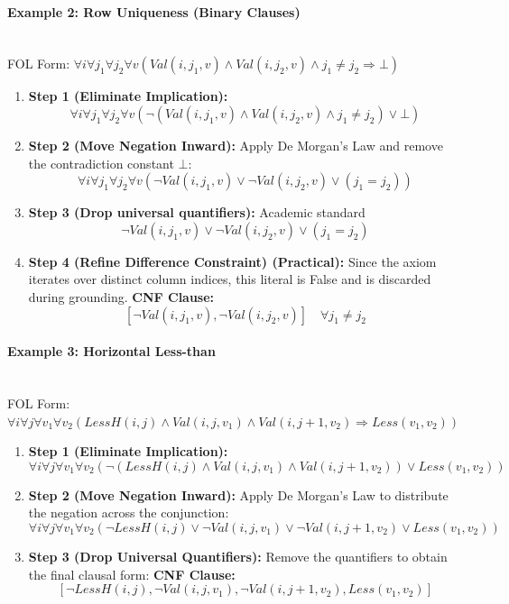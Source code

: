 \paragraph{Example 2: Row Uniqueness (Binary Clauses)}~\\
FOL Form: $\forall i \forall j_1 \forall j_2 \forall v (Val(i, j_1, v) \wedge Val(i, j_2, v) \wedge j_1 \neq j_2 \Rightarrow \bot)$
\begin{enumerate}
    \item \textbf{Step 1 (Eliminate Implication):}
    $$\forall i \forall j_1 \forall j_2 \forall v (\neg (Val(i, j_1, v) \wedge Val(i, j_2, v) \wedge j_1 \neq j_2) \vee \bot)$$
    \item \textbf{Step 2 (Move Negation Inward):} Apply De Morgan's Law and remove the contradiction constant $\bot$:
    $$\forall i \forall j_1 \forall j_2 \forall v (\neg Val(i, j_1, v) \vee \neg Val(i, j_2, v) \vee (j_1 = j_2))$$
    \item \textbf{Step 3 (Drop universal quantifiers):} Academic standard
    $$\neg Val(i, j_1, v) \vee \neg Val(i, j_2, v) \vee (j_1 = j_2)$$
    \item \textbf{Step 4 (Refine Difference Constraint) (Practical):} Since the axiom iterates over distinct column indices, this literal is False and is discarded during grounding.
    \textbf{CNF Clause:} $$[\neg Val(i, j_1, v), \neg Val(i, j_2, v)] \quad \forall j_1 \neq j_2$$
\end{enumerate}

\paragraph{Example 3: Horizontal Less-than}~\\
FOL Form: $\forall i \forall j \forall v_1 \forall v_2 (LessH(i, j) \wedge Val(i, j, v_1) \wedge Val(i, j+1, v_2) \Rightarrow Less(v_1, v_2))$
\begin{enumerate}
    \item \textbf{Step 1 (Eliminate Implication):}
    $$\forall i \forall j \forall v_1 \forall v_2 (\neg (LessH(i, j) \wedge Val(i, j, v_1) \wedge Val(i, j+1, v_2)) \vee Less(v_1, v_2))$$
    \item \textbf{Step 2 (Move Negation Inward):} Apply De Morgan's Law to distribute the negation across the conjunction:
    $$\forall i \forall j \forall v_1 \forall v_2 (\neg LessH(i, j) \vee \neg Val(i, j, v_1) \vee \neg Val(i, j+1, v_2) \vee Less(v_1, v_2))$$
    \item \textbf{Step 3 (Drop Universal Quantifiers):} Remove the quantifiers to obtain the final clausal form:
    \textbf{CNF Clause:} $$[\neg LessH(i, j), \neg Val(i, j, v_1), \neg Val(i, j+1, v_2), Less(v_1, v_2)]$$
\end{enumerate}
